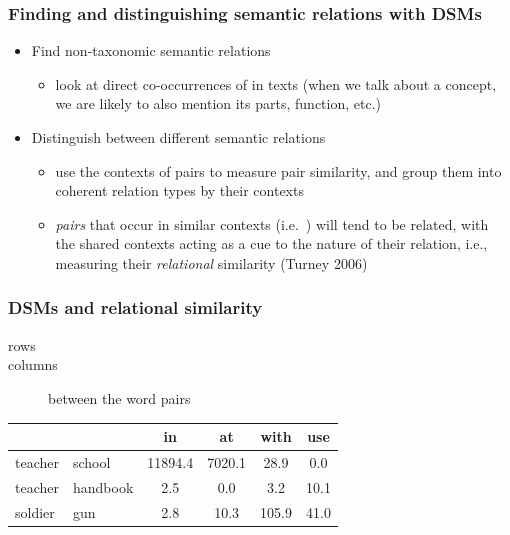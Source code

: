\begin{frame}
  \frametitle{Finding and distinguishing semantic relations with DSMs}

  \begin{itemize}
    \item Find non-taxonomic semantic relations
      \begin{itemize}
      \item look at direct co-occurrences of  in texts (when
        we talk about a concept, we are likely to also mention its
        parts, function, etc.)
      \end{itemize}
      \pause
    \item Distinguish between different semantic relations
      \begin{itemize}
      \item use the contexts of pairs to measure pair similarity, and
        group them into coherent relation types by their contexts
      \item \emph{pairs} that occur in similar contexts (i.e.\
   ) will tend to be
    related, with the shared contexts acting as a cue to the nature of
    their relation, i.e., measuring their \emph{relational} similarity
    (Turney 2006)
     
      \end{itemize}
  \end{itemize}
\end{frame}


\begin{frame}
  \frametitle{DSMs and relational similarity}
  
 \begin{description}
    \item [rows] 
    \item [columns]  between the word pairs
    \end{description}

  \begin{center}
        \begin{tabular}{ll|c|c|c|c}
          &        &{\color{counterpoint}in}     &{\color{counterpoint}at}    &{\color{counterpoint}with}&{\color{counterpoint}use}  \\
          \hline
          {\color{secondary}teacher}&{\color{primary}school}  &11894.4&7020.1&28.9 &0.0 \\
          {\color{secondary}teacher}&{\color{primary}handbook}&2.5    &0.0   &3.2  &10.1\\
          {\color{secondary}soldier}&{\color{primary}gun}     &2.8    &10.3  &105.9&41.0\\
        \end{tabular}
      \end{center}
\end{frame}



